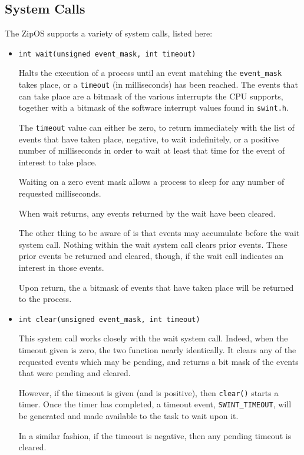 \documentclass{gqtekspec}
\begin{document}
\subsection{System Calls}
The ZipOS supports a variety of system calls, listed here:
\begin{itemize}
\item {\tt int wait(unsigned event\_mask, int timeout)}

	Halts the execution of a process until an event matching the
	{\tt event\_mask} takes place, or a {\tt timeout} (in milliseconds)
	has been reached.  The events that can take place are a
	bitmask of the various interrupts the CPU supports, together with a 
	bitmask of the software interrupt values found in {\tt swint.h}.

	The {\tt timeout} value can either be zero, to return immediately with
	the list of events that have taken place, negative, to wait
	indefinitely, or a positive number of milliseconds in order to wait at
	least that time for the event of interest to take place.

	Waiting on a zero event mask allows a process to sleep for any number
	of requested milliseconds.

	When wait returns, any events returned by the wait have been cleared.

	The other thing to be aware of is that events may accumulate before the
	wait system call.  Nothing within the wait system call clears prior
	events.  These prior events be returned and cleared, though, if
	the wait call indicates an interest in those events.  

	Upon return, the a bitmask of events that have taken place will be
	returned to the process.

\item {\tt int clear(unsigned event\_mask, int timeout)}

	This system call works closely with the wait system call.  Indeed,
	when the timeout given is zero, the two function nearly identically. 
	It clears any of the requested events which may be pending, and returns
	a bit mask of the events that were pending and cleared.

	However, if the timeout is given (and is positive), then {\tt clear()}
	starts a timer.  Once the timer has completed, a timeout event,
	{\tt SWINT\_TIMEOUT}, will be generated and made available to the task
	to wait upon it.

	In a similar fashion, if the timeout is negative, then any pending
	timeout is cleared.


\end{itemize}
\end{document}
